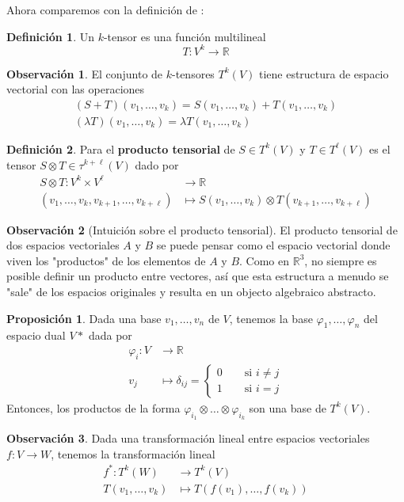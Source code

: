 \documentclass[spanish]{book}
\theoremstyle{definition}
\newtheorem*{defn}{Definición}
\newtheorem*{prop}{Proposición}
\newtheorem*{obs}{Observación}
\newcommand{\R}{\mathbb{R}}
\begin{document}
	Ahora comparemos con la definición de \cite{Spivak}:
	\begin{defn}
		Un $k$-tensor es una función multilineal
		\[T:V^k\to\R\]
	\end{defn}
	\begin{obs}
		El conjunto de $k$-tensores $T^k(V)$  tiene estructura de espacio vectorial con las operaciones
		\begin{align*}
			(S+T)(v_1,\ldots,v_k)=S(v_1,\ldots,v_k)+T(v_1,\ldots,v_k)\\
			(\lambda T)(v_1,\ldots,v_k)=\lambda T(v_1,\ldots,v_k)
		\end{align*}
	\end{obs}
	\begin{defn}
		Para  el \textbf{producto tensorial} de $S\in T^k(V)$ y $T\in T^\ell(V)$ es el tensor $S\otimes T\in\tau^{k+\ell}(V)$ dado por
		\begin{align*}
			S\otimes T:V^k\times V^\ell&\to\R\\
			(v_1,\ldots,v_k,v_{k+1},\ldots,v_{k+\ell})&\mapsto S(v_1,\ldots,v_k)\otimes T(v_{k+1},\ldots,v_{k+\ell})
		\end{align*}
	\end{defn}
	\begin{obs}[Intuición sobre el producto tensorial]
		El producto tensorial de dos espacios vectoriales $A$ y $B$ se puede pensar como el espacio vectorial donde viven los "productos" de los elementos de $A$ y $B$. Como en $\R^3$, no siempre es posible definir un producto entre vectores, así que esta estructura a menudo se "sale" de los espacios originales y resulta en un objecto algebraico abstracto.
	\end{obs}
	\begin{prop}
		Dada una base $v_1,\ldots,v_n$ de $V$, tenemos la base $\varphi_1,\ldots,\varphi_n$ del espacio dual $V*$ dada por
		\begin{align*}
			\varphi_i:V&\to\R\\
			v_j&\mapsto\delta_{ij}=\begin{cases}
				0\qquad\text{si }i\neq j\\
				1\qquad\text{si }i=j
			\end{cases}
		\end{align*}
		Entonces, los productos de la forma $\varphi_{i_1}\otimes\ldots\otimes\varphi_{i_k}$ son una base de $T^k(V)$.
	\end{prop}
	\begin{obs}\label{pullback}
		Dada una transformación lineal entre espacios vectoriales $f:V\to W$, tenemos la transformación lineal 
		\begin{align*}
			f^*:T^k(W)&\to T^k(V)\\
			T(v_1,\ldots,v_k)&\mapsto T(f(v_1),\ldots,f(v_k))
		\end{align*}
	\end{obs}
\end{document}
